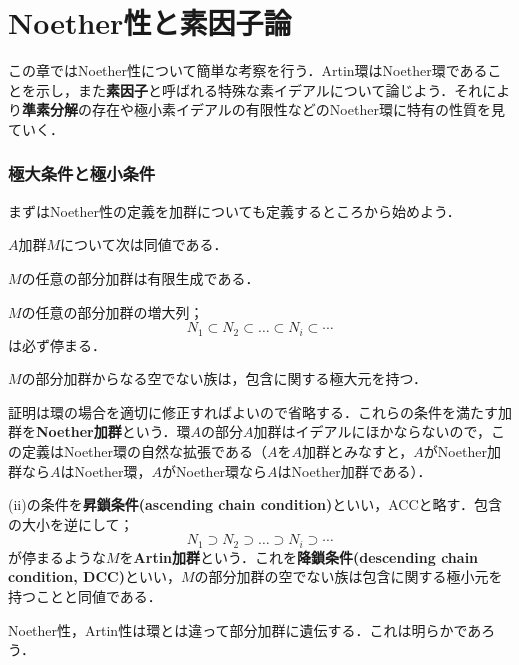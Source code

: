 \newpage
\part[Noetherian properties and Associated prime ideal]{Noether性と素因子論}

この章ではNoether性について簡単な考察を行う．Artin環はNoether環であることを示し，また\textbf{素因子}と呼ばれる特殊な素イデアルについて論じよう．それにより\textbf{準素分解}の存在や極小素イデアルの有限性などのNoether環に特有の性質を見ていく．
\section{極大条件と極小条件}

まずはNoether性の定義を加群についても定義するところから始めよう．
\begin{prop}
	$A$加群$M$について次は同値である．
	\begin{sakura}
		\item $M$の任意の部分加群は有限生成である．
		\item $M$の任意の部分加群の増大列；
		\[N_1\subset N_2\subset\dots\subset N_i\subset\cdots\]
		は必ず停まる．
		\item $M$の部分加群からなる空でない族は，包含に関する極大元を持つ．
	\end{sakura}
\end{prop} 

証明は環の場合を適切に修正すればよいので省略する．これらの条件を満たす加群を\textbf{Noether加群}という．環$A$の部分$A$加群はイデアルにほかならないので，この定義はNoether環の自然な拡張である（$A$を$A$加群とみなすと，$A$がNoether加群なら$A$はNoether環，$A$がNoether環なら$A$はNoether加群である）．

(ii)の条件を\textbf{昇鎖条件(ascending chain condition)}といい，ACCと略す．包含の大小を逆にして；
\[N_1\supset N_2\supset\dots\supset N_i\supset\cdots\]
が停まるような$M$を\textbf{Artin加群}という．これを\textbf{降鎖条件(descending chain condition, DCC)}といい，$M$の部分加群の空でない族は包含に関する極小元を持つことと同値である．

Noether性，Artin性は環とは違って部分加群に遺伝する．これは明らかであろう．


